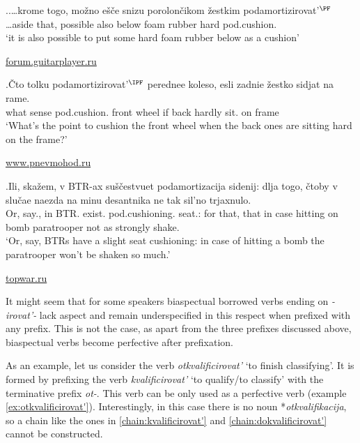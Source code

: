 \ex.\label{ex:cushion}\ag.\label{ex:cushion1}…krome togo, mo\v{z}no e\v{s}\v{c}e snizu porolon\v{c}ikom \v{z}estkim podamortizirovat'$^{\PF}$\\		
…aside that, possible also below {foam rubber} hard pod.cushion.\\
\vspace{0.5em}
`it is also possible to put some hard foam rubber below as a cushion'
\begin{flushright}
\vspace{-0.5em}
\url{forum.guitarplayer.ru}
\end{flushright}
\vspace{0.5em}\bg.\label{ex:cushion2}\v{C}to tolku podamortizirovat'$^{\IPF}$ perednee koleso, esli zadnie \v{z}estko sidjat na rame.\\
what sense pod.cushion. front wheel if back hardly sit. on frame\\
\vspace{0.5em}
`What's the point to cushion the front wheel when the back ones are sitting hard on the frame?'
\begin{flushright}
\vspace{-0.5em}
\url{www.pnevmohod.ru}
\end{flushright}

\exg.\label{ex:podamortizacija}Ili, ska\v{z}em, v BTR-ax su\v{s}\v{c}estvuet podamortizacija sidenij: dlja togo, \v{c}toby v slu\v{c}ae naezda na minu desantnika ne tak sil'no trjaxnulo.\\
Or, say., in BTR. exist. pod.cushioning. seat.: for that, that in case hitting on bomb paratrooper not as strongly shake.\\
\vspace{0.5em}
`Or, say, BTRs have a slight seat cushioning: in case of hitting a bomb the paratrooper won't be shaken so much.'
\begin{flushright}
\vspace{-0.5em}
\url{topwar.ru}
\end{flushright}

It might seem that for some speakers biaspectual borrowed verbs ending on \textit{-irovat'-} lack aspect and remain underspecified in this respect when prefixed with any prefix. This is not the case, as apart from the three prefixes discussed above, biaspectual verbs become perfective after prefixation. 

As an example, let us consider the verb \textit{otkvalificirovat'} `to finish classifying'. It is formed by prefixing the verb \textit{kvalificirovat'} `to qualify/to classify' with the terminative prefix \textit{ot-}. This verb can be only used as a perfective verb (example \ref{ex:otkvalificirovat'}). Interestingly, in this case there is no noun *\textit{otkvalifikacija}, so a chain like the ones in \ref{chain:kvalificirovat'} and \ref{chain:dokvalificirovat'} cannot be constructed. 

